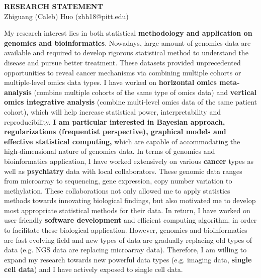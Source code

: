 \documentclass[a4paper, 10pt]{article}
\begin{document}
\thispagestyle{fancy}
\lhead{}
\rhead{}
\renewcommand{\headrulewidth}{0pt} 
\renewcommand{\footrulewidth}{0pt} 


\pagestyle{fancy}
\lhead{\textcolor{gray}{\it Zhiguang (Caleb) Huo}}
\rhead{\textcolor{gray}{\thepage/\totalpages{}}}


\begin{center}
{\LARGE \bf RESEARCH STATEMENT}\\
\vspace*{0.1cm}
{\normalsize Zhiguang (Caleb) Huo (zhh18@pitt.edu)}
\end{center}


My research interest lies in both statistical \textbf{methodology and application on genomics and bioinformatics}.
Nowadays, large amount of genomics data are available and required to develop rigorous statistical method to understand the disease and pursue better treatment.
These datasets provided unprecedented opportunities to reveal cancer mechanisms via combining multiple cohorts or multiple-level omics data types.
I have worked on \textbf{horizontal omics meta-analysis} (combine multiple cohorts of the same type of omics data) and 
\textbf{vertical omics integrative analysis} (combine multi-level omics data of the same patient cohort),
which will help increase statistical power, interpretability and reproducibility.
\textbf{I am particular interested in Bayesian approach, regularizations (frequentist perspective), graphical models and effective statistical computing,}
which are capable of accommodating the high-dimensional nature of genomics data.
In terms of genomics and bioinformatics application,
I have worked extensively on various \textbf{cancer} types as well as \textbf{psychiatry} data with local collaborators. 
These genomic data ranges from microarray to sequencing, gene expression, copy number variation to methylation.
These collaborations not only allowed me to apply statistics methods towards innovating biological findings,
but also motivated me to develop most appropriate statistical methods for their data.
In return, I have worked on user friendly \textbf{software development} and efficient computing algorithm, in order to facilitate these biological application.
However, genomics and bioinformatics are fast evolving field and 
new types of data are gradually replacing old types of data (e.g. NGS data are replacing microarray data).
Therefore, I am willing to expand my research towards new powerful data types (e.g. imaging data, \textbf{single cell data})
and I have actively exposed to single cell data.
\end{document}
